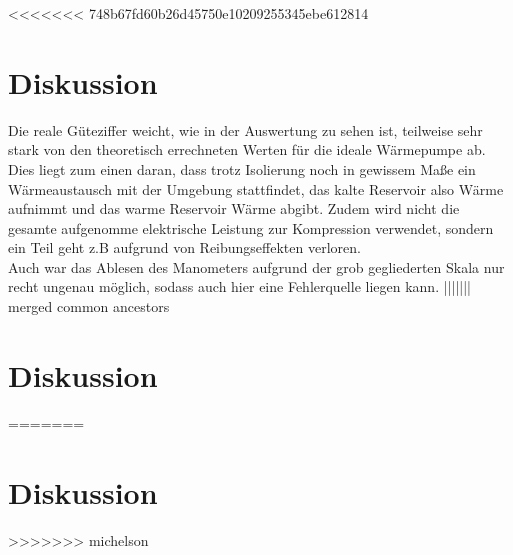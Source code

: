 <<<<<<< 748b67fd60b26d45750e10209255345ebe612814
\section{Diskussion}
\label{sec:Diskussion}
Die reale Güteziffer weicht, wie in der Auswertung zu sehen ist, teilweise sehr stark von den
theoretisch errechneten Werten für die ideale Wärmepumpe ab. Dies liegt zum einen
daran, dass trotz Isolierung noch in gewissem Maße ein Wärmeaustausch mit der Umgebung
stattfindet, das kalte Reservoir also Wärme aufnimmt und das warme Reservoir Wärme abgibt.
Zudem wird nicht die gesamte aufgenomme elektrische Leistung zur Kompression
verwendet, sondern ein Teil geht z.B aufgrund von Reibungseffekten verloren.
\\
Auch war das Ablesen des Manometers aufgrund der grob gegliederten Skala nur recht ungenau möglich,
sodass auch hier eine Fehlerquelle liegen kann.
||||||| merged common ancestors
\section{Diskussion}
\label{sec:Diskussion}
=======
\section{Diskussion}
\label{sec:Diskussion}
>>>>>>> michelson
